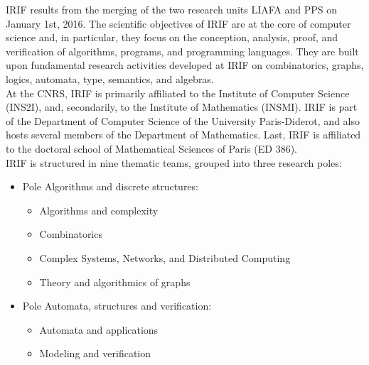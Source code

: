 IRIF results from the merging of the two research units LIAFA and PPS on January 1st, 2016. The scientific objectives of IRIF are at the core of computer science and, in particular, they focus on the conception, analysis, proof, and verification of algorithms, programs, and programming languages. They are built upon fundamental research activities developed at IRIF on combinatorics, graphs, logics, automata, type, semantics, and algebras.\\

At the CNRS, IRIF is primarily affiliated to the Institute of Computer Science (INS2I), and, secondarily, to the Institute of Mathematics (INSMI). IRIF is part of the Department of Computer Science of the University Paris-Diderot, and also hosts several members of the Department of Mathematics. Last, IRIF is affiliated to the doctoral school of Mathematical Sciences of Paris (ED 386).\\ 

IRIF is structured in nine thematic teams, grouped into three research poles: 
\begin{itemize}
\item Pole Algorithms and discrete structures:

\begin{itemize}
\item Algorithms and complexity
\end{itemize}

\begin{itemize}
\item Combinatorics
\end{itemize}

\begin{itemize}
\item Complex Systems, Networks, and Distributed Computing 
\end{itemize}

\begin{itemize}
\item Theory and algorithmics of graphs 
\end{itemize}

\end{itemize}

\begin{itemize}
\item Pole Automata, structures and verification:

\begin{itemize}
\item Automata and applications
\end{itemize}
\begin{itemize}
\item Modeling and verification
\end{itemize}

\end{itemize}


